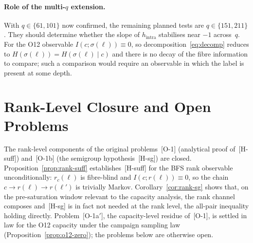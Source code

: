 \documentclass[11pt,a4paper]{article}
\theoremstyle{plain}
\theoremstyle{definition}
\theoremstyle{remark}
\begin{document}
  \paragraph{Role of the multi-$q$ extension.}
    With $q \in \{61, 101\}$ now confirmed, the remaining planned tests are $q \in \{151, 211\}$.
    They should determine whether the slope of $h_{\mathrm{intra}}$ stabilises near $-1$
    across~$q$.
    For the O12 observable $I(c;\sigma(\ell)) \equiv 0$, so decomposition~\eqref{eq:decomp}
    reduces to $H(\sigma(\ell)) = H(\sigma(\ell) \mid c)$ and there is no decay of the fibre
    information to compare; such a comparison would require an observable in which the label is
    present at some depth.

    \clearpage
  \section{Rank-Level Closure and Open Problems}
  \label{sec:open}

  The rank-level components of the original problems~\textup{[O-1]} (analytical proof
  of~\textup{[H-suff]}) and~\textup{[O-1b]} (the semigroup hypothesis~\textup{[H-sg]}) are closed.
  Proposition~\ref{prop:rank-suff} establishes~\textup{[H-suff]} for the BFS rank observable
  unconditionally: $r_c(\ell)$ is fibre-blind and $I(c; r(\ell)) \equiv 0$, so the chain
  $c \to r(\ell) \to r(\ell')$ is trivially Markov.
  Corollary~\ref{cor:rank-sg} shows that, on the pre-saturation window relevant to the capacity
  analysis, the rank channel composes and~\textup{[H-sg]} is in fact not needed at the rank level,
  the all-pair inequality holding directly.
  Problem~\textup{[O-1a$'$]}, the capacity-level residue of~\textup{[O-1]}, is settled in law
  for the O12 capacity under the campaign sampling law (Proposition~\ref{prop:o12-zero}); the
  problems below are otherwise open.
\end{document}
